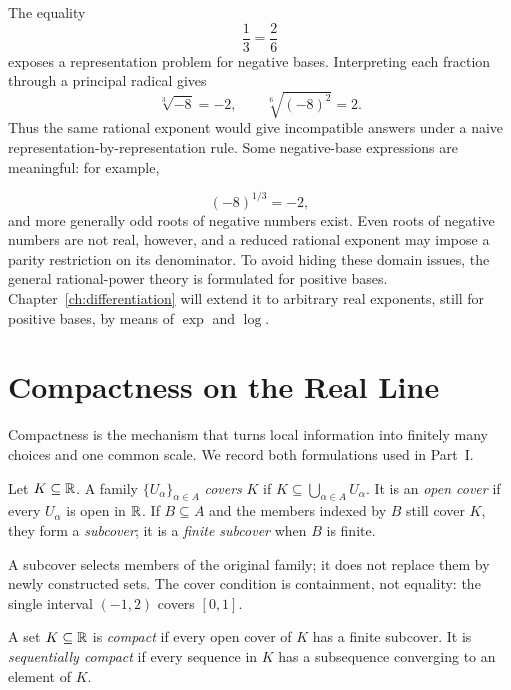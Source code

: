 \begin{remark}
The equality
\[
\frac13=\frac26
\]
 exposes a representation problem for
negative bases. Interpreting each fraction through a principal radical gives
\[
\sqrt[3]{-8}=-2,\qquad \sqrt[6]{(-8)^2}=2.
\]
Thus the same rational exponent would give incompatible answers under a
naive representation-by-representation rule.
Some negative-base expressions are meaningful: for example,

\[
(-8)^{1/3}=-2,
\]
 and more generally odd roots of negative numbers exist.
Even roots of negative numbers are not real, however, and a reduced rational
exponent may impose a parity restriction on its denominator. To avoid hiding
these domain issues, the general rational-power theory is formulated for
positive bases. Chapter~\ref{ch:differentiation} will extend it to arbitrary
real exponents, still for positive bases, by means of \(\exp\) and \(\log\).
\end{remark}

\section{Compactness on the Real Line}
\label{sec:real-line-compactness}

Compactness is the mechanism that turns local information into finitely
many choices and one common scale. We record both formulations used in
Part~I.

\begin{definition}
Let $K\subseteq\mathbb{R}$. A family $\{U_\alpha\}_{\alpha\in A}$ \emph{covers}
$K$ if $K\subseteq\bigcup_{\alpha\in A}U_\alpha$. It is an \emph{open
cover} if every $U_\alpha$ is open in $\mathbb{R}$. If $B\subseteq A$ and the
members indexed by $B$ still cover $K$, they form a \emph{subcover}; it is
a \emph{finite subcover} when $B$ is finite.
\end{definition}
A subcover selects members of the original family; it does not replace
them by newly constructed sets. The cover condition is containment, not
equality: the single interval $(-1,2)$ covers $[0,1]$.

\begin{definition}
\label{def:real-compactness}
A set $K\subseteq\mathbb{R}$ is \emph{compact} if every open cover of $K$ has a
finite subcover. It is \emph{sequentially compact} if every sequence in
$K$ has a subsequence converging to an element of $K$.
\end{definition}

